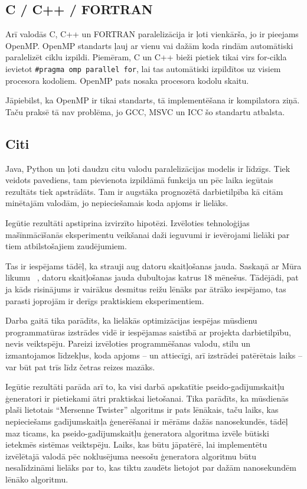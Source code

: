 \documentclass{ludis}
\begin{document}
\subsection{C / C++ / FORTRAN}
Arī valodās C, C++ un FORTRAN paralelizācija ir ļoti vienkārša, jo ir pieejams OpenMP. OpenMP standarts ļauj ar vienu vai dažām koda rindām automātiski paralelizēt ciklu izpildi. Piemēram, C un C++ bieži pietiek tikai virs for-cikla ievietot \texttt{\#pragma omp parallel for}, lai tas automātiski izpildītos uz visiem procesora kodoliem. OpenMP pats nosaka procesora kodolu skaitu.

Jāpiebilst, ka OpenMP ir tikai standarts, tā implementēšana ir kompilatora ziņā. Taču praksē tā nav problēma, jo GCC, MSVC un ICC šo standartu atbalsta.

\subsection{Citi}
Java, Python un ļoti daudzu citu valodu paralelizācijas modelis ir līdzīgs. Tiek veidots pavediens, tam pievienota izpildāmā funkcija un pēc laika iegūtais rezultāts tiek apstrādāts. Tam ir augstāka prognozētā darbietilpība kā citām minētajām valodām, jo nepieciešamais koda apjoms ir lielāks.

Iegūtie rezultāti apstiprina izvirzīto hipotēzi. Izvēloties tehnoloģijas mašīnmācīšanās eksperimentu veikšanai daži ieguvumi ir ievērojami lielāki par tiem atbilstošajiem zaudējumiem.

Tas ir iespējams tādēļ, ka strauji aug datoru skaitļošanas jauda. Saskaņā ar Mūra likumu ~\cite{moore_cramming}, datoru skaitļošanas jauda dubultojas katrus 18 mēnešus. Tādējādi, pat ja kāds risinājums ir vairākus desmitus reižu lēnāks par ātrāko iespējamo, tas parasti joprojām ir derīgs praktiskiem eksperimentiem.

Darba gaitā tika parādīts, ka lielākās optimizācijas iespējas mūsdienu programmatūras izstrādes vidē ir iespējamas saistībā ar projekta darbietilpību, nevis veiktspēju. Pareizi izvēloties programmēšanas valodu, stilu un izmantojamos līdzekļus, koda apjoms -- un attiecīgi, arī izstrādei patērētais laiks -- var būt pat trīs līdz četras reizes mazāks.

Iegūtie rezultāti parāda arī to, ka visi darbā apskatītie pseido-gadījumskaitļu ģeneratori ir pietiekami ātri praktiskai lietošanai. Tika parādīts, ka mūsdienās plaši lietotais ``Mersenne Twister'' algoritms ir pats lēnākais, taču laiks, kas nepieciešams gadījumskaitļa ģenerēšanai ir mērāms dažās nanosekundēs, tādēļ maz ticams, ka pseido-gadījumskaitļu ģeneratora algoritma izvēle būtiski ietekmēs sistēmas veiktspēju. Laiks, kas būtu jāpatērē, lai implementētu izvēlētajā valodā pēc noklusējuma neesošu ģeneratora algoritmu būtu nesalīdzināmi lielāks par to, kas tiktu zaudēts lietojot par dažām nanosekundēm lēnāko algoritmu.
\end{document}
